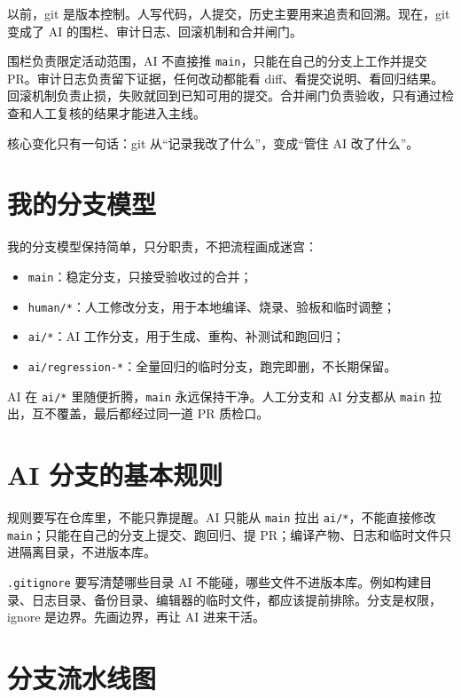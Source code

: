 以前，git 是版本控制。人写代码，人提交，历史主要用来追责和回溯。现在，git 变成了 AI 的围栏、审计日志、回滚机制和合并闸门。

围栏负责限定活动范围，AI 不直接推 \texttt{main}，只能在自己的分支上工作并提交 PR。审计日志负责留下证据，任何改动都能看 diff、看提交说明、看回归结果。回滚机制负责止损，失败就回到已知可用的提交。合并闸门负责验收，只有通过检查和人工复核的结果才能进入主线。

核心变化只有一句话：git 从“记录我改了什么”，变成“管住 AI 改了什么”。

\section{我的分支模型}

我的分支模型保持简单，只分职责，不把流程画成迷宫：

\begin{itemize}
\item \texttt{main}：稳定分支，只接受验收过的合并；
\item \texttt{human/*}：人工修改分支，用于本地编译、烧录、验板和临时调整；
\item \texttt{ai/*}：AI 工作分支，用于生成、重构、补测试和跑回归；
\item \texttt{ai/regression-*}：全量回归的临时分支，跑完即删，不长期保留。
\end{itemize}

AI 在 \texttt{ai/*} 里随便折腾，\texttt{main} 永远保持干净。人工分支和 AI 分支都从 \texttt{main} 拉出，互不覆盖，最后都经过同一道 PR 质检口。

\section{AI 分支的基本规则}

规则要写在仓库里，不能只靠提醒。AI 只能从 \texttt{main} 拉出 \texttt{ai/*}，不能直接修改 \texttt{main}；只能在自己的分支上提交、跑回归、提 PR；编译产物、日志和临时文件只进隔离目录，不进版本库。

\texttt{.gitignore} 要写清楚哪些目录 AI 不能碰，哪些文件不进版本库。例如构建目录、日志目录、备份目录、编辑器的临时文件，都应该提前排除。分支是权限，ignore 是边界。先画边界，再让 AI 进来干活。

\section{分支流水线图}

